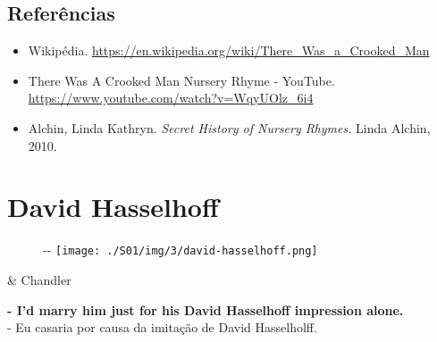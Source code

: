 \hypertarget{referuxeancias-2}{%
\subsection{Referências}\label{referuxeancias-2}}

\begin{itemize}
\tightlist
\item
  \sloppy Wikipédia. \url{https://en.wikipedia.org/wiki/There_Was_a_Crooked_Man}
\item
  \sloppy There Was A Crooked Man Nursery Rhyme - YouTube. \url{https://www.youtube.com/watch?v=WqyUOlz_6i4}
\item
  Alchin, Linda Kathryn. \emph{Secret History of Nursery Rhymes.} Linda
  Alchin, 2010.
\end{itemize}

\hypertarget{david-hasselhoff}{%
\section{David Hasselhoff}\label{david-hasselhoff}}

\begin{figure}[!ht]
  \begin{adjustwidth}{-\oddsidemargin-1in}{-\rightmargin}
    \centering
    \texttt{[image: ./S01/img/3/david-hasselhoff.png]}
  \end{adjustwidth}
\end{figure}

\begin{tcolorbox}[enhanced,center upper,
    drop fuzzy shadow southeast, boxrule=0.3pt,
    lower separated=false, breakable,
    colframe=black!30!dialogoBorder,colback=white]
\begin{minipage}[c]{0.16\linewidth}
   & \centering \scriptsize{Chandler}
\end{minipage}
\hfill
\begin{minipage}[c]{0.8\linewidth}
  \textbf{- I'd marry him just for his David Hasselhoff impression alone.}\\
  - Eu casaria por causa da imitação de David Hasselholff.
\end{minipage}
\end{tcolorbox}

